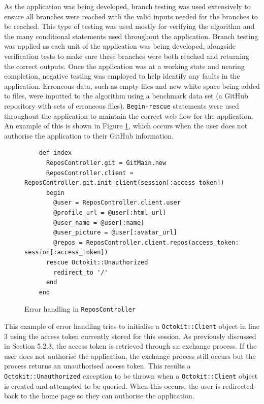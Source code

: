As the application was being developed, branch testing was used extensively to ensure all branches were reached with the valid inputs needed for the branches to be reached. This type of testing was used mostly for verifying the algorithm and the many conditional statements used throughout the application. Branch testing was applied as each unit of the application was being developed, alongside verification tests to make sure these branches were both reached and returning the correct outputs. Once the application was at a working state and nearing completion, negative testing was employed to help identify any faults in the application. Erroneous data, such as empty files and new white space being added to files, were inputted to the algorithm using a benchmark data set (a GitHub repository with sets of erroneous files). \texttt{Begin-rescue} statements were used throughout the application to maintain the correct web flow for the application. An example of this is shown in Figure \ref{fig:9}, which occurs when the user does not authorise the application to their GitHub information.

\begin{figure}[h]
    \centering
    \begin{verbatim}
    def index
      ReposController.git = GitMain.new
      ReposController.client = ReposController.git.init_client(session[:access_token])
      begin
        @user = ReposController.client.user
        @profile_url = @user[:html_url]
        @user_name = @user[:name]
        @user_picture = @user[:avatar_url]
        @repos = ReposController.client.repos(access_token: session[:access_token])
      rescue Octokit::Unauthorized
        redirect_to '/'
      end
    end
    \end{verbatim}
    \caption{Error handling in \texttt{ReposController}}
    \label{fig:9}
\end{figure}

This example of error handling tries to initialise a \texttt{Octokit::Client} object in line 3 using the access token currently stored for this session. As previously discussed in Section 5.2.3, the access token is retrieved through an exchange process. If the user does not authorise the application, the exchange process still occurs but the process returns an unauthorised access token. This results a \texttt{Octokit::Unauthorized} exception to be thrown when a \texttt{Octokit::Client} object is created and attempted to be queried. When this occurs, the user is redirected back to the home page so they can authorise the application.

